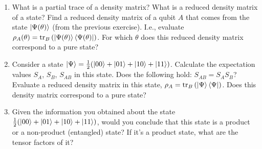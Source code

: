 \documentclass[11pt, a4paper, tightenlines, notitlepage]{revtex4-1}
\begin{document}
\begin{enumerate}
\item What is a partial trace of a density matrix? What is a reduced density matrix of a state? Find a reduced density matrix of a qubit $A$ that comes from the state $\ket{\Psi(\theta)}$ (from the previous exercise). I.e., evaluate $\rho_A(\theta)=\mathrm{tr}_B\left(\ket{\Psi(\theta)}\bra{\Psi(\theta)}\right)$. For which $\theta$ does this reduced density matrix correspond to a pure state?

\item Consider a state $\ket{\Psi}=\frac{1}{2}(\ket{00}+\ket{01}+\ket{10}+\ket{11})$. Calculate the expectation values $S_A$, $S_B$, $S_{AB}$ in this state. Does the following hold: $S_{AB}=S_AS_B$? Evaluate a reduced density matrix in this state, $\rho_A=\mathrm{tr}_B\left(\ket{\Psi}\bra{\Psi}\right)$. Does this density matrix correspond to a pure state?

\item Given the information you obtained about the state $\frac{1}{2}(\ket{00}+\ket{01}+\ket{10}+\ket{11})$, would you conclude that this state is a product or a non-product (entangled) state? If it's a product state, what are the tensor factors of it?


\end{enumerate}
\end{document}

